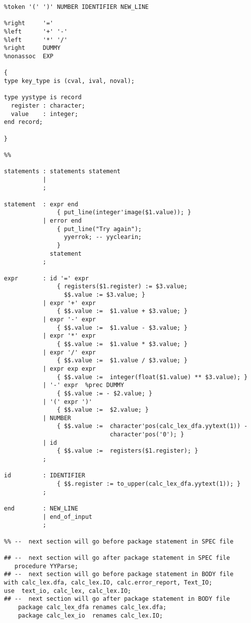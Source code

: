 \small
\begin{verbatim}
%token '(' ')' NUMBER IDENTIFIER NEW_LINE

%right     '='
%left      '+' '-' 
%left      '*' '/' 
%right     DUMMY
%nonassoc  EXP

{
type key_type is (cval, ival, noval); 

type yystype is record
  register : character;
  value    : integer; 
end record;
        
}

%% 

statements : statements statement 
           | 
           ;

statement  : expr end
               { put_line(integer'image($1.value)); }
           | error end 
               { put_line("Try again"); 
                 yyerrok; -- yyclearin;
               }
             statement
           ; 

expr       : id '=' expr 
               { registers($1.register) := $3.value; 
                 $$.value := $3.value; }
           | expr '+' expr 
               { $$.value :=  $1.value + $3.value; }
           | expr '-' expr 
               { $$.value :=  $1.value - $3.value; }
           | expr '*' expr 
               { $$.value :=  $1.value * $3.value; }
           | expr '/' expr 
               { $$.value :=  $1.value / $3.value; }
           | expr exp expr  
               { $$.value :=  integer(float($1.value) ** $3.value); }
           | '-' expr  %prec DUMMY 
               { $$.value := - $2.value; }
           | '(' expr ')' 
               { $$.value :=  $2.value; }
           | NUMBER
               { $$.value :=  character'pos(calc_lex_dfa.yytext(1)) -
                              character'pos('0'); } 
           | id 
               { $$.value :=  registers($1.register); }
           ; 

id         : IDENTIFIER
               { $$.register := to_upper(calc_lex_dfa.yytext(1)); }
           ;

end        : NEW_LINE
           | end_of_input 
           ;

%% --  next section will go before package statement in SPEC file

## --  next section will go after package statement in SPEC file 
   procedure YYParse;
## --  next section will go before package statement in BODY file
with calc_lex.dfa, calc_lex.IO, calc.error_report, Text_IO;
use  text_io, calc_lex, calc_lex.IO;
## --  next section will go after package statement in BODY file
    package calc_lex_dfa renames calc_lex.dfa;   
    package calc_lex_io  renames calc_lex.IO;   


\end{verbatim}
